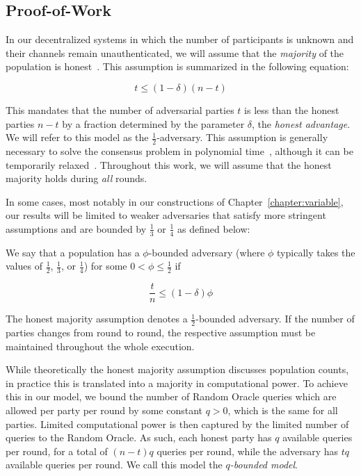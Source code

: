 \subsection{Proof-of-Work}
In our decentralized systems in which the number of participants is unknown and
their channels remain unauthenticated, we will assume that the \emph{majority}
of the population is honest~\cite{backbone}. This assumption is summarized in
the following equation:


\[
t \leq (1 - \delta)(n - t)
\]

This mandates that the number of adversarial parties $t$ is less than the honest
parties $n - t$ by a fraction determined by the parameter $\delta$, the
\emph{honest advantage}. We will refer to
this model as the $\frac{1}{2}$-adversary. This assumption is generally
necessary to solve the consensus problem in polynomial time~\cite{okun},
although it can be temporarily relaxed~\cite{dishonest}. Throughout this
work, we will assume that the honest majority holds during \emph{all} rounds.

In some cases, most notably in our constructions of
Chapter~\ref{chapter:variable}, our results will be limited to weaker
adversaries that satisfy more stringent assumptions and are bounded by
$\frac{1}{3}$ or $\frac{1}{4}$ as defined below:

\begin{definition}
  We say that a population has a $\phi$-bounded adversary (where $\phi$
  typically takes the values of $\frac{1}{2}$, $\frac{1}{3}$, or $\frac{1}{4}$)
  for some $0 < \phi \leq \frac{1}{2}$ if

  \[
  \frac{t}{n} \leq (1 - \delta)\phi
  \]
\end{definition}

The honest majority assumption denotes a $\frac{1}{2}$-bounded adversary. If the
number of parties changes from round to round, the respective assumption must be
maintained throughout the whole execution.

While theoretically the honest majority assumption discusses population counts,
in practice this is translated into a majority in computational power. To
achieve this in our model, we bound the number of Random Oracle queries which
are allowed per party per round by some constant $q > 0$, which is the same for all
parties. Limited computational power is then captured by the limited number of
queries to the Random Oracle. As such, each honest party has $q$ available
queries per round, for a total of $(n - t)q$ queries per round, while the
adversary has $tq$ available queries per round. We call this model the
\emph{$q$-bounded model}.

